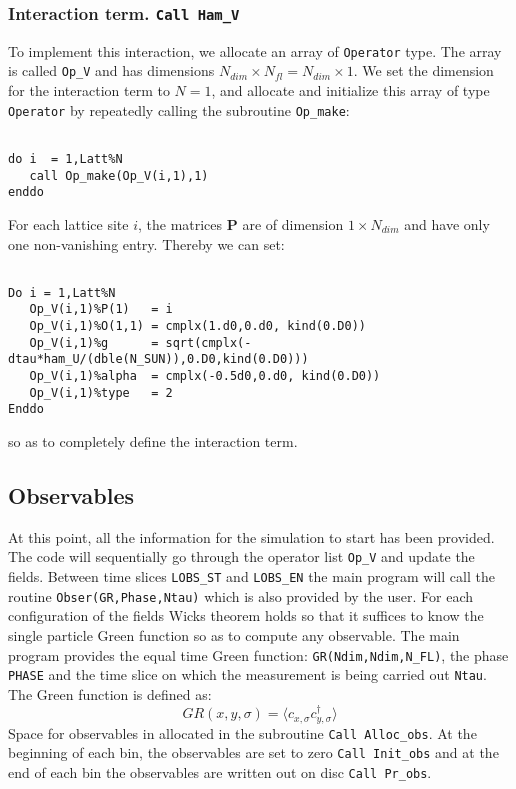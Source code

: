
\subsubsection{Interaction term. \texttt{Call Ham\_V}}
To implement this interaction, we allocate an array of \texttt{Operator} type. The array is called  \texttt{Op\_V} and has dimensions $N_{dim}\times N_{fl}=N_{dim} \times 1$. 
We set the dimension for the interaction term to  $N=1$, and  allocate and initialize this array of type  \texttt{Operator} by repeatedly calling the subroutine \texttt{Op\_make}: 

\begin{lstlisting}

do i  = 1,Latt%N
   call Op_make(Op_V(i,1),1)
enddo

\end{lstlisting}
For each lattice site $i$, the  matrices ${\bm P}$ are of dimension $1\times N_{dim} $ and have only one non-vanishing entry. Thereby we can set:

\begin{lstlisting}

Do i = 1,Latt%N
   Op_V(i,1)%P(1)   = i
   Op_V(i,1)%O(1,1) = cmplx(1.d0,0.d0, kind(0.D0))
   Op_V(i,1)%g      = sqrt(cmplx(-dtau*ham_U/(dble(N_SUN)),0.D0,kind(0.D0)))
   Op_V(i,1)%alpha  = cmplx(-0.5d0,0.d0, kind(0.D0))
   Op_V(i,1)%type   = 2
Enddo

\end{lstlisting}
so as to completely define the interaction term. 


\subsection{Observables}

At this point, all the information   for the simulation to  start has been provided.  The code will sequentially go through  the operator list  \texttt{Op\_V}  and update the  fields.   Between  time slices   \texttt{LOBS\_ST}  and 
\texttt{LOBS\_EN}   the main program will call the routine  \texttt{Obser(GR,Phase,Ntau)}   which is also provided by the user.  For each configuration of the  fields Wicks theorem holds so that it suffices 
to  know the single particle Green function so as to compute  any observable. 
The main program provides the  equal time Green function: 
\texttt{GR(Ndim,Ndim,N\_FL)}, the phase \texttt{PHASE} and the time slice on which the measurement is being carried out \texttt{Ntau}.   The Green function is defined as: 
\begin{equation}
	 GR(x,y,\sigma)  = \langle c^{\phantom{\dagger}}_{x,\sigma} c^{\dagger}_{y,\sigma}  \rangle
\end{equation}
Space for observables in allocated in the  subroutine \texttt{Call Alloc\_obs}. At the beginning of each bin, the  observables are set to zero \texttt{Call Init\_obs} and at the end of each bin the observables are written out on disc \texttt{Call Pr\_obs}.



